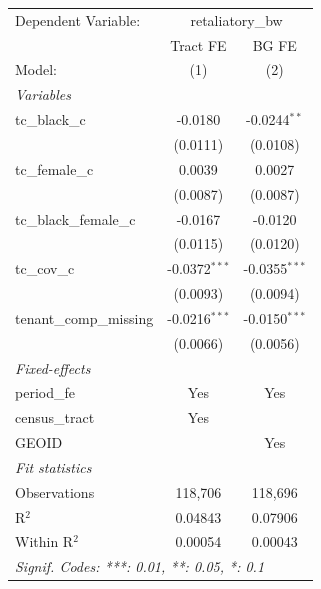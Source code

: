 \begin{tabular}{lcc}
   \tabularnewline \midrule \midrule
   Dependent Variable: & \multicolumn{2}{c}{retaliatory\_bw}\\
                           & Tract FE        & BG FE \\   
   Model:                  & (1)             & (2)\\  
   \midrule
   \emph{Variables}\\
   tc\_black\_c            & -0.0180         & -0.0244$^{**}$\\   
                           & (0.0111)        & (0.0108)\\   
   tc\_female\_c           & 0.0039          & 0.0027\\   
                           & (0.0087)        & (0.0087)\\   
   tc\_black\_female\_c    & -0.0167         & -0.0120\\   
                           & (0.0115)        & (0.0120)\\   
   tc\_cov\_c              & -0.0372$^{***}$ & -0.0355$^{***}$\\   
                           & (0.0093)        & (0.0094)\\   
   tenant\_comp\_missing   & -0.0216$^{***}$ & -0.0150$^{***}$\\   
                           & (0.0066)        & (0.0056)\\   
   \midrule
   \emph{Fixed-effects}\\
   period\_fe              & Yes             & Yes\\  
   census\_tract           & Yes             & \\  
   GEOID                   &                 & Yes\\  
   \midrule
   \emph{Fit statistics}\\
   Observations            & 118,706         & 118,696\\  
   R$^2$                   & 0.04843         & 0.07906\\  
   Within R$^2$            & 0.00054         & 0.00043\\  
   \midrule \midrule
   \multicolumn{3}{l}{\emph{Signif. Codes: ***: 0.01, **: 0.05, *: 0.1}}\\
\end{tabular}
\par\endgroup
